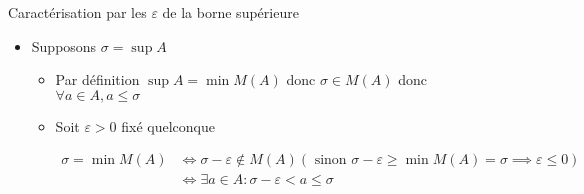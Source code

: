 \documentclass{article}
\begin{document}
\begin{question_kholle}[{
        Soit $A \in \mathcal{P}(\mathbb{R})$ une partie non vide et majorée.
        Soit $\sigma \in \mathbb{R}$
        $$
          \sigma = \sup A \iff \left\{ \begin{array}{ll}
            \forall a \in A, a \leqslant \sigma \\
            \forall \varepsilon \in \mathbb{R}_{+}^{*}, \exists a \in A : \sigma - \varepsilon < a \leqslant \sigma
          \end{array}\right.
        $$
      }]{Caractérisation par les $\varepsilon$ de la borne supérieure}

  \begin{itemize}[label = $\star$]
    \item Supposons $\sigma = \sup A$
          \begin{itemize}[label = $\bullet$]
            \item Par définition $\sup A = \min M(A)$ donc $\sigma \in M(A)$ donc $\forall a \in A, a \leqslant \sigma$

            \item Soit $\varepsilon >0$ fixé quelconque

                  \begin{align*}
                    \sigma = \min M(A) & \iff \sigma - \varepsilon \not\in M(A) (\text{ sinon } \sigma - \varepsilon \geqslant \min M(A)= \sigma \implies \varepsilon \leqslant 0) \\
                                       & \iff \exists a \in A: \sigma - \varepsilon < a \leqslant \sigma
                  \end{align*}

          \end{itemize}


\end{itemize}
\end{question_kholle}
\end{document}
